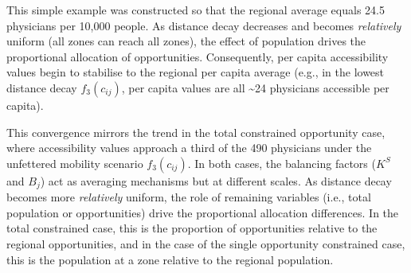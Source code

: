 \documentclass[
  10pt,
  letterpaper,
]{article}
\begin{document}
\begin{table}

\caption{\label{tbl-simple-example-attraction-constrained-accessibility-per-capita}Simple
system: singly constrained accessible opportunities per capita.}


\end{table}%

This simple example was constructed so that the regional average equals
24.5 physicians per 10,000 people. As distance decay decreases and
becomes \emph{relatively} uniform (all zones can reach all zones), the
effect of population drives the proportional allocation of
opportunities. Consequently, per capita accessibility values begin to
stabilise to the regional per capita average (e.g., in the lowest
distance decay \(f_3(c_{ij})\), per capita values are all
\textasciitilde24 physicians accessible per capita).

This convergence mirrors the trend in the total constrained opportunity
case, where accessibility values approach a third of the 490 physicians
under the unfettered mobility scenario \(f_3(c_{ij})\). In both cases,
the balancing factors (\(K^S\) and \(B_j\)) act as averaging mechanisms
but at different scales. As distance decay becomes more
\emph{relatively} uniform, the role of remaining variables (i.e., total
population or opportunities) drive the proportional allocation
differences. In the total constrained case, this is the proportion of
opportunities relative to the regional opportunities, and in the case of
the single opportunity constrained case, this is the population at a
zone relative to the regional population.
\end{document}
